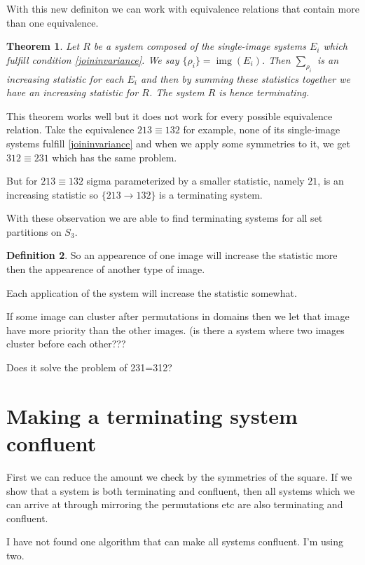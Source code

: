 \documentclass[a4paper, 11pt]{article}
\newtheorem{theorem}{Theorem}[section]
\theoremstyle{definition}
\newtheorem{definition}[theorem]{Definition}
\newcommand{\Sym}{S}
\DeclareMathOperator{\img}{img}
\begin{document}
With this new definiton we can work with equivalence relations that contain more than one
equivalence.

\begin{theorem}
    Let $R$ be a system composed of the single-image systems $E_i$ which fulfill
    condition \eqref{joininvariance}. We say $\{\rho_i\} = \img(E_i)$. Then $\sum\nolimits_{\rho_i}$ 
    is an increasing statistic for each $E_i$ and then by summing these
    statistics together we have an increasing statistic for $R$.
    The system $R$ is hence terminating.
\end{theorem}

This theorem works well but it does not work for every possible equivalence relation.
Take the equivalence $213 \equiv 132$ for example, none of its single-image systems fulfill
\eqref{joininvariance} and when we apply some symmetries to it, we get $312
\equiv 231$ which has the same problem.

But for $213 \equiv 132$ sigma parameterized by a smaller statistic, namely $21$, is an
increasing statistic so $\{ 213 \to 132 \}$ is a terminating system.

With these observation we are able to find terminating systems for all set
partitions on $\Sym_3$.

\begin{definition}
    So an appearence of one image will increase the statistic more then the
    appearence of another type of image.

    Each application of the system will increase the statistic somewhat.

    If some image can cluster after permutations in domains then we let that
    image have more priority than the other images. (is there a system where two
    images cluster before each other???

    Does it solve the problem of 231=312?
\end{definition}

\section{Making a terminating system confluent}
First we can reduce the amount we check by the symmetries of the square.
If we show that a system is both terminating and confluent, then all systems
which we can arrive at through mirroring the permutations etc are also
terminating and confluent.

I have not found one algorithm that can make all systems confluent.
I'm using two.
\end{document}
